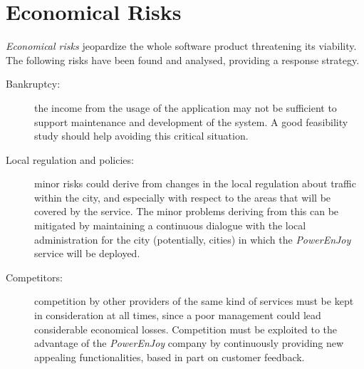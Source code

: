 
\section{Economical Risks}
\textit{Economical risks} jeopardize the whole software product threatening its viability.
The following risks have been found and analysed, providing a response strategy. 
\begin{description}
\item[Bankruptcy:] the income from the usage of the application may not be sufficient to support maintenance and development of the system. A good feasibility study should help avoiding this critical situation.
\item[Local regulation and policies:] minor risks could derive from changes in the local regulation about traffic within the city, and especially with respect to the areas that will be covered by the service. The minor problems deriving from this can be mitigated by maintaining a continuous dialogue with the local administration for the city (potentially, cities) in which the \textit{PowerEnJoy} service will be deployed.
\item[Competitors:] competition by other providers of the same kind of services must be kept in consideration at all times, since a poor management could lead considerable economical losses. Competition must be exploited to the advantage of the \textit{PowerEnJoy} company by continuously providing new appealing functionalities, based in part on customer feedback.
\end{description}

